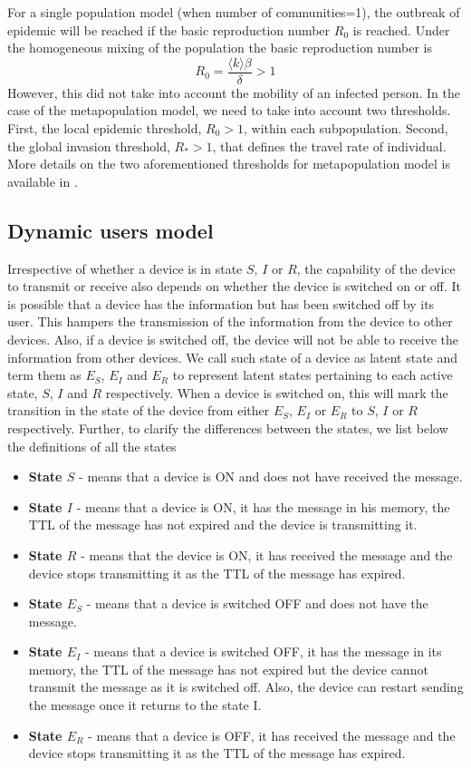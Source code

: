 \documentclass[review]{elsarticle}
\begin{document}
For a single population model (when number of communities=1), the outbreak of epidemic will be reached if the basic reproduction number $R_0$ is reached. Under the homogeneous mixing of the population the basic reproduction number is
$$R_0 = \frac{\langle k \rangle\beta}{\delta} > 1$$
However, this did not take into account the mobility of an infected person. In the case of the metapopulation model, we need to take into account two thresholds. First, the local epidemic threshold, $R_0 > 1$, within each subpopulation. Second, the global invasion threshold, $R_{*} > 1$, that defines the travel rate of individual. More details on the two aforementioned thresholds for metapopulation model is available in \cite{24418011}.

\subsection{Dynamic users model}\label{subsec:latent}

Irrespective of whether a device is in state $S$, $I$ or $R$, the capability of the device to transmit or receive also depends on whether the device is switched on or off. It is possible that a device has the information but has been switched off by its user. This hampers the transmission of the information from the device to other devices. Also, if a device is switched off, the device will not be able to receive the information from other devices. We call such state of a device as latent state and term them as $E_{S}$, $E_{I}$ and $E_{R}$ to represent latent states pertaining to each active state, $S$, $I$ and $R$ respectively. When a device is switched on, this will mark the transition in the state of the device from either $E_{S}$, $E_{I}$ or $E_{R}$ to $S$, $I$ or $R$ respectively. Further, to clarify the differences between the states, we list below the definitions of all the states

\begin{itemize}
\item \textbf{State $S$} - means that a device is ON and does not have received the message.
\item  \textbf{State $I$} - means that a device is ON, it has the message in his memory, the TTL of the message has not expired and the device is transmitting it.
\item \textbf{State $R$} - means that the device is ON, it has received the message and the device stops transmitting it as the TTL of the message has expired.
\item \textbf{State $E_S$} - means that a device is switched OFF and does not have the message.
\item \textbf{State $E_I$} - means that a device is switched OFF, it has the message in its memory, the TTL of the message has not expired but the device cannot transmit the message as it is switched off. Also, the device can restart sending the message once it returns to the state I.
\item \textbf{State $E_R$} - means that a device is OFF, it has received the message and the device stops transmitting it as the TTL of the message has expired.
\end{itemize}
\end{document}
